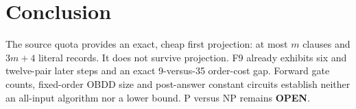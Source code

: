 \documentclass[11pt]{article}
\begin{document}
\section{Conclusion}

The source quota provides an exact, cheap first projection: at most $m$
clauses and $3m+4$ literal records.  It does not survive projection.  F9
already exhibits six and twelve-pair later steps and an exact 9-versus-35
order-cost gap.  Forward gate counts, fixed-order OBDD size and post-answer
constant circuits establish neither an all-input algorithm nor a lower bound.
P versus NP remains \textbf{OPEN}.
\end{document}
